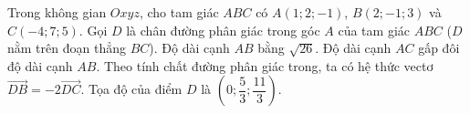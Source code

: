 \begin{ex}
Trong không gian $Oxyz$, cho tam giác $ABC$ có $A(1;2;-1)$, $B(2;-1;3)$ và $C(-4;7;5)$. Gọi $D$ là chân đường phân giác trong góc $A$ của tam giác $ABC$ ($D$ nằm trên đoạn thẳng $BC$).
\choiceTF
{\True Độ dài cạnh $AB$ bằng $\sqrt{26}$.}
{Độ dài cạnh $AC$ gấp đôi độ dài cạnh $AB$.}
{Theo tính chất đường phân giác trong, ta có hệ thức vectơ $\overrightarrow{DB}=-2\overrightarrow{DC}$.}
{Tọa độ của điểm $D$ là $\left(0;\dfrac53;\dfrac{11}3\right)$.}
\end{ex}
